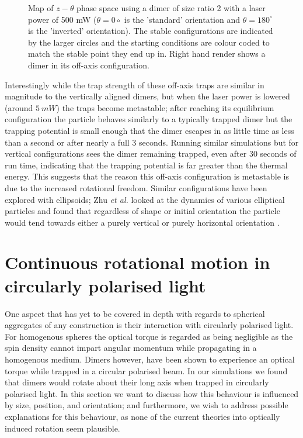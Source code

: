 \begin{figure}[h!]
\begin{subfigure}{0.32\linewidth}
		\caption{}
	\end{subfigure}
	\caption{Map of $z-\theta$ phase space using a dimer of
		size ratio 2 with a laser power of 500 mW ($\theta=0
		\circ$ is the 'standard' orientation and $\theta=180
		^\circ$ is the 'inverted' orientation). The stable 
		configurations are indicated by the larger circles 
		and the starting conditions are colour coded to match 
		the stable point they end up in. Right hand render 
		shows a dimer in its off-axis configuration.}
	\label{fig:off_axis}
\end{figure}

Interestingly while the trap strength of these off-axis traps 
are similar in magnitude to the vertically aligned dimers, 
but when the laser power is lowered (around $5\ mW$) the traps 
become metastable; after reaching its equilibrium configuration 
the particle behaves similarly to a typically trapped dimer but 
the trapping potential is small enough that the dimer escapes 
in as little time as less than a second or after nearly a full 
3 seconds. Running similar simulations but for vertical 
configurations sees the dimer remaining trapped, even after 30 
seconds of run time, indicating that the trapping potential is 
far greater than the thermal energy. This suggests that the 
reason this off-axis configuration is metastable is due to the 
increased rotational freedom. Similar configurations have been 
explored with ellipsoids; Zhu \textit{et al.} looked at the 
dynamics of various elliptical particles and found that regardless 
of shape or initial orientation the particle would tend towards
either a purely vertical or purely horizontal orientation 
\cite{Zhu2021}. 

\section{Continuous rotational motion in circularly polarised light}
One aspect that has yet to be covered in depth with regards 
to spherical aggregates of any construction is their interaction 
with circularly polarised light. For homogenous spheres the 
optical torque is regarded as being negligible as the spin 
density cannot impart angular momentum while propagating in a 
homogenous medium. Dimers however, have been shown to experience 
an optical torque \cite{Vigilante2020, Ahn2018, Reimann2018} 
while trapped in a circular polarised beam. In our simulations 
we found that dimers would rotate about their long axis when 
trapped in circularly polarised light. In this section we want 
to discuss how this behaviour is influenced by size, position, 
and orientation; and furthermore, we wish to address possible 
explanations for this behaviour, as none of the current
theories into optically induced rotation seem plausible.

